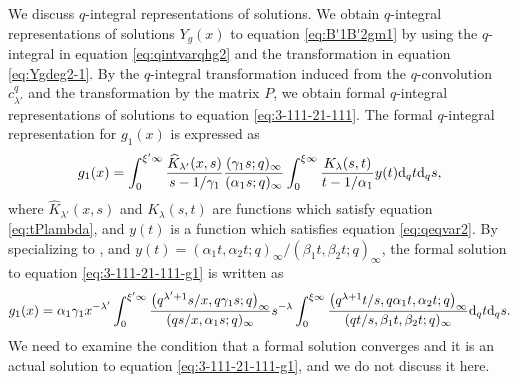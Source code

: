 \documentclass[pdftex]{sigma}
\numberwithin{equation}{section}
\theoremstyle{definition}
\begin{document}
We discuss $q$-integral representations of solutions.
We obtain $q$-integral representations of solutions $Y_g(x) $ to equation \eqref{eq:B'1B'2gm1} by using the $q$-integral in equation \eqref{eq:qintvarqhg2} and the transformation in equation \eqref{eq:Ygdeg2-1}.
By the $q$-integral transformation induced from the $q$-convolution $c_{\lambda'}^q$ and the transformation by the matrix $P$, we obtain formal $q$-integral representations of solutions to equation \eqref{eq:3-111-21-111}.
The formal $q$-integral representation for $g_1(x)$ is
expressed as
\begin{equation*}
 g_1(x) = \int_0^{\xi' \infty} \frac{\widehat{K}_{\lambda'}(x,s)}{s - 1/\gamma_1} \frac{(\gamma_1 s; q)_{\infty}}{(\alpha_1 s; q)_{\infty}} \int_0^{\xi \infty} \frac{K_{\lambda}(s,t)}{t - 1/\alpha_1} y(t) {\rm d}_q t {\rm d}_q s,
\end{equation*}
where $\widehat{K}_{\lambda' }(x,s) $ and $K_{\lambda }(s,t)$ are functions which satisfy equation \eqref{eq:tPlambda}, and $y(t)$ is a function which satisfies equation \eqref{eq:qeqvar2}.
By specializing to ,  and $y(t) = (\alpha_1 t , \alpha_2 t; q)_{\infty}/(\beta_1 t , \beta_2 t; q)_{\infty}$, the formal solution to equation \eqref{eq:3-111-21-111-g1} is written as
\begin{equation*}
 g_1(x) = \alpha_1 \gamma_1 x^{-\lambda '} \int_0^{\xi' \infty} \frac{\bigl(q^{\lambda '+1}s/x, q \gamma_1 s ;q\bigr)_{\infty}}{(qs/x, \alpha_1 s ;q)_{\infty}} s^{-\lambda } \int_0^{\xi \infty} \frac{\bigl(q^{\lambda+1}t/s, q \alpha_1 t, \alpha_2 t ;q\bigr)_{\infty}}{(qt/s, \beta_1 t, \beta_2 t ;q)_{\infty}} {\rm d}_q t {\rm d}_q s.
\end{equation*}
We need to examine the condition that a formal solution converges and it is an actual solution to equation \eqref{eq:3-111-21-111-g1}, and we do not discuss it here.
\end{document}
